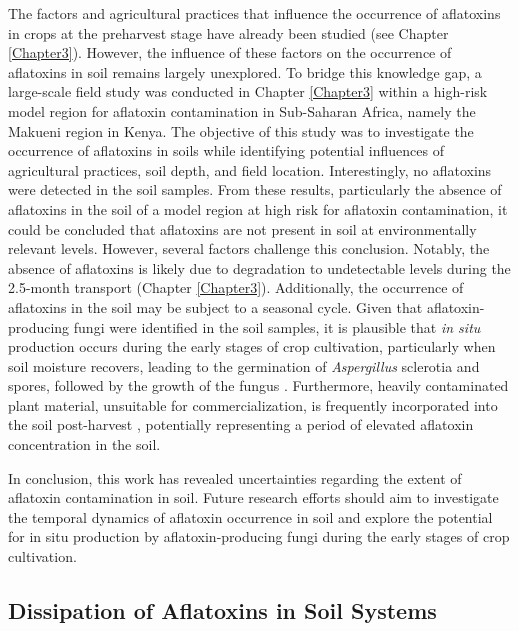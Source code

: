 The factors and agricultural practices that influence the occurrence of aflatoxins in crops at the preharvest stage have already been studied (see Chapter \ref{Chapter3}). However, the influence of these factors on the occurrence of aflatoxins in soil remains largely unexplored. To bridge this knowledge gap, a large-scale field study was conducted in Chapter  \ref{Chapter3} within a high-risk model region for aflatoxin contamination in Sub-Saharan Africa, namely the Makueni region in Kenya. The objective of this study was to investigate the occurrence of aflatoxins in soils while identifying potential influences of agricultural practices, soil depth, and field location. Interestingly, no aflatoxins were detected in the soil samples. From these results, particularly the absence of aflatoxins in the soil of a model region at high risk for aflatoxin contamination, it could be concluded that aflatoxins are not present in soil at environmentally relevant levels. However, several factors challenge this conclusion. Notably, the absence of aflatoxins is likely due to degradation to undetectable levels during the 2.5-month transport (Chapter \ref{Chapter3}). Additionally, the occurrence of aflatoxins in the soil may be subject to a seasonal cycle. Given that aflatoxin-producing fungi were identified in the soil samples, it is plausible that \textit{in situ} production occurs during the early stages of crop cultivation, particularly when soil moisture recovers, leading to the germination of \textit{Aspergillus} sclerotia and spores, followed by the growth of the fungus \citep{accinelli2008aspergillus, elmholt2008mycotoxins}. Furthermore, heavily contaminated plant material, unsuitable for commercialization, is frequently incorporated into the soil post-harvest \citep{horn2003ecology, horn1995effect}, potentially representing a period of elevated aflatoxin concentration in the soil.


In conclusion, this work has revealed uncertainties regarding the extent of aflatoxin contamination in soil. Future research efforts should aim to investigate the temporal dynamics of aflatoxin occurrence in soil and explore the potential for in situ production by aflatoxin-producing fungi during the early stages of crop cultivation.

\subsection{Dissipation of Aflatoxins in Soil Systems}

